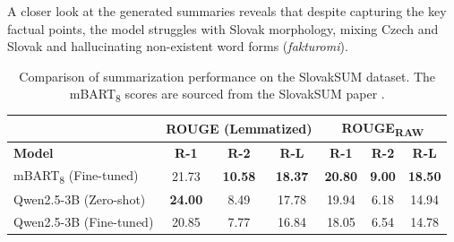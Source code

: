 \documentclass[11pt,a4paper]{article}
\begin{document}
A closer look at the generated summaries reveals that despite capturing the key factual points, the model struggles with Slovak morphology, mixing Czech and Slovak and hallucinating non-existent word forms (\textit{fakturomi}).

\begin{table}[H]
	\centering
	\small
	\begin{tabular}{@{}l|ccc|ccc@{}}
		\toprule
		                                    & \multicolumn{3}{c|}{\textbf{ROUGE (Lemmatized)}} & \multicolumn{3}{c}{\textbf{ROUGE\textsubscript{RAW}}}                                                                    \\ \midrule
		\textbf{Model}                      & \textbf{R-1}                                     & \textbf{R-2}                                          & \textbf{R-L}   & \textbf{R-1}   & \textbf{R-2}  & \textbf{R-L}   \\ \midrule
		mBART\textsubscript{8} (Fine-tuned) & 21.73                                            & \textbf{10.58}                                        & \textbf{18.37} & \textbf{20.80} & \textbf{9.00} & \textbf{18.50} \\  \midrule
		Qwen2.5-3B (Zero-shot)              & \textbf{24.00}                                   & 8.49                                                  & 17.78          & 19.94          & 6.18          & 14.94          \\
		Qwen2.5-3B (Fine-tuned)             & 20.85                                            & 7.77                                                  & 16.84          & 18.05          & 6.54          & 14.78          \\ \bottomrule
	\end{tabular}
	\caption{Comparison of summarization performance on the SlovakSUM dataset. The mBART\textsubscript{8} scores are sourced from the SlovakSUM paper \cite{Ondrejova2024}.}
	\label{tab:summary_comparison}
\end{table}

\vspace{1em}
\end{document}
